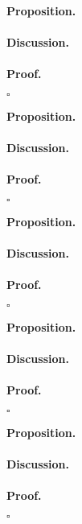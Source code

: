 \documentclass[12pt]{exam}
\begin{document}
\begin{questions}


\question
\textbf{Proposition.}
\\
\\\textbf{Discussion.}
\\
\\\textbf{Proof.}
\begin{flushright}
$\square$
\end{flushright}

\question
\textbf{Proposition.}
\\
\\\textbf{Discussion.}
\\
\\\textbf{Proof.}
\begin{flushright}
$\square$
\end{flushright}

\question
\textbf{Proposition.}
\\
\\\textbf{Discussion.}
\\
\\\textbf{Proof.}
\begin{flushright}
$\square$
\end{flushright}

\question
\textbf{Proposition.}
\\
\\\textbf{Discussion.}
\\
\\\textbf{Proof.}
\begin{flushright}
$\square$
\end{flushright}

\question
\textbf{Proposition.}
\\
\\\textbf{Discussion.}
\\
\\\textbf{Proof.}
\begin{flushright}
$\square$
\end{flushright}

\end{questions}
\end{document}
